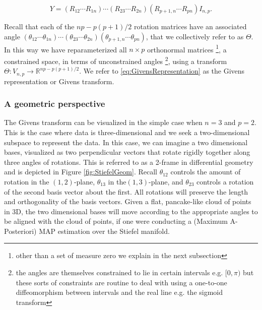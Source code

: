 \documentclass{article}
\begin{document}
\begin{equation}
\label{eq:GivensRepresentation}
Y = (R_{12} \cdots R_{1n}) \cdots (R_{23} \cdots R_{2n}) (R_{p+1,n} \cdots R_{pn}) I_{n,p}.
\end{equation}

Recall that each of the $np -p(p+1)/2$ rotation matrices have an associated  angle $(\theta_{12} \cdots \theta_{1n}) \cdots (\theta_{23} \cdots \theta_{2n}) (\theta_{p+1,n} \cdots \theta_{pn})$, that we collectively refer to as $\Theta$. In this way we have reparameterized all $n \times p$ orthonormal matrices \footnote{other than a set of measure zero we explain in the next subsection}, a constrained space, in terms of unconstrained angles \footnote{the angles are themselves constrained to lie in certain intervals e.g. $[0, \pi)$ but these sorts of constraints are routine to deal with using a one-to-one diffeomorphism between intervals and the real line e.g. the sigmoid transform}, using a transform $\Theta: V_{n,p} \to \mathbb{R}^{np -p(p+1)/2}$. We refer to \ref{eq:GivensRepresentation} as the Givens representation or Givens transform.

\subsubsection{A geometric perspective}
The Givens transform can be visualized in the simple case when $n = 3$ and $p = 2$. This is the case where data is three-dimensional and we seek a two-dimensional subspace to represent the data. In this case, we can imagine a two dimensional bases, visualized as two perpendicular vectors that rotate rigidly together along three angles of rotations. This is referred to as a 2-frame in differential geometry \citep{muirhead2009aspects} and is depicted in Figure \ref{fig:StiefelGeom}. Recall $\theta_{12}$ controls the amount of rotation in the $(1,2)$-plane, $\theta_{13}$ in the$(1,3)$-plane, and $\theta_{23}$ controls a rotation of the second basis vector about the first. All rotations will preserve the length and orthogonality of the basis vectors. Given a flat, pancake-like cloud of points in 3D, the two dimensional bases will move according to the appropriate angles to be aligned with the cloud of points, if one were conducting a (Maximum A-Posteriori) MAP estimation over the Stiefel manifold.

\end{document}
